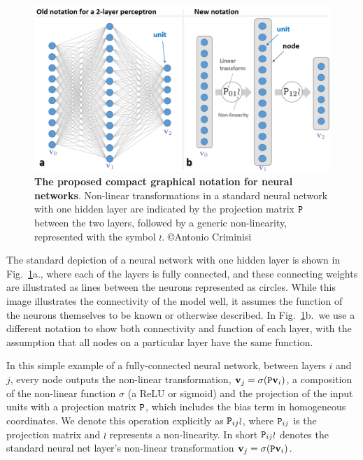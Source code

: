 \documentclass[thesis]{subfiles}
\begin{document}
\begin{figure}[htbp!] 
\centering
\includegraphics[width=1.0\textwidth]{newGraphLanguage}
\caption[New graphical notation for a standard neural network with one hidden layer.]{{\bf The proposed compact graphical notation for neural networks}. Non-linear transformations in a standard neural network with one hidden layer are indicated by the projection matrix $\mat P$ between the two layers, followed by a generic non-linearity, represented with the symbol $\wr$. \copyright Antonio Criminisi}
\label{fig:newGraphLanguage}
\end{figure}

The standard depiction of a neural network with one hidden layer is shown in Fig.~\ref{fig:newGraphLanguage}a., where each of the layers is fully connected, and these connecting weights are illustrated as lines between the neurons represented as circles. While this image illustrates the connectivity of the model well, it assumes the function of the neurons themselves to be known or otherwise described. In Fig.~\ref{fig:newGraphLanguage}b.\ we use a different notation to show both connectivity and function of each layer, with the assumption that all nodes on a particular layer have the same function.

In this simple example of a fully-connected neural network, between layers $i$ and $j$, every node outputs the non-linear transformation, $\vec v_j = \sigma(\mat P \vec v_i)$, a composition of the non-linear function $\sigma$ (\eg a ReLU or sigmoid) and the projection of the input units with a projection matrix $\mat P$, which includes the bias term in homogeneous coordinates. We denote this operation explicitly as $\mat P_{ij} \wr$, where $\mat P_{ij}$ is the projection matrix and $\wr$ represents a non-linearity. In short $\mat P_{ij} \wr$ denotes the standard neural net layer's non-linear transformation $\vec v_j = \sigma(\mat P \vec v_i)$. 
\end{document}
